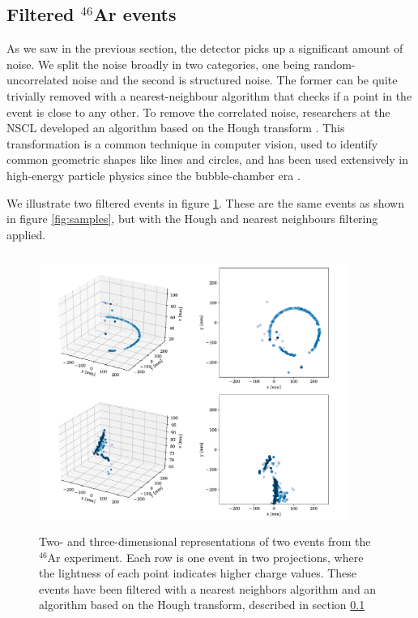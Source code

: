 \documentclass[review,number,sort&compress]{elsarticle}
\begin{document}
\subsection{Filtered \texorpdfstring{${}^{46}$Ar}{46Ar} events}\label{sec:filtered}


As we saw in the previous section, the detector picks up a significant amount of noise. We split the noise broadly in two categories,  one being random-uncorrelated noise and the second is structured noise. The former can be quite trivially removed with a nearest-neighbour algorithm that checks if a point in the event is close to any other. To remove the correlated noise, researchers at the NSCL developed an algorithm based on the Hough transform \cite{Newman1972}. This transformation is a common technique in computer vision, used to identify common geometric shapes like lines and circles, and has been used extensively in high-energy particle physics since the bubble-chamber era \cite{Hough:1959}.  %

We illustrate two filtered events in figure \ref{fig:samples_filtered}. These are the same events as shown in figure \ref{fig:samples}, but with the Hough and nearest neighbours filtering applied. 

\begin{figure}[ht]
\centering
\includegraphics[width=0.9\textwidth, height=9cm]{custom_work/examples_filtered.pdf}
\caption[Displaying filtered events in 2D and 3D]{Two- and three-dimensional representations of two events from the ${}^{46}$Ar experiment. Each row is one event in two projections, where the lightness of each point indicates higher charge values. These events have been filtered with a nearest neighbors algorithm and an algorithm based on the Hough transform, described in section \ref{sec:filtered}}\label{fig:samples_filtered}
\end{figure}
\end{document}
